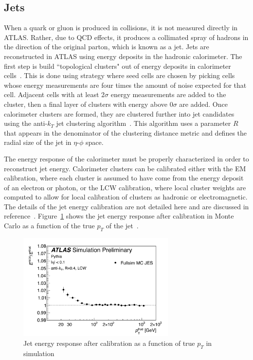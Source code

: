 \subsection{Jets}

When a quark or gluon is produced in collisions, it is not measured directly in ATLAS. Rather, due to QCD effects, it produces a collimated spray of hadrons in the direction of the original parton, which is known as a jet. Jets are reconstructed in ATLAS using energy deposits in the hadronic calorimeter. The first step is build ``topological clusters" out of energy deposits in calorimeter cells~\cite{TopoClusters,TopoClusters2}. This is done using strategy where seed cells are chosen by picking cells whose energy measurements are four times the amount of noise expected for that cell. Adjacent cells with at least $2\sigma$ energy measurements are added to the cluster, then a final layer of clusters with energy above $0\sigma$ are added. Once calorimeter clusters are formed, they are clustered further into jet candidates using the anti-$k_T$ jet clustering algorithm~\cite{AntiKt}. This algorithm uses a parameter $R$ that appears in the denominator of the clustering distance metric and defines the radial size of the jet in $\eta$-$\phi$ space. 

The energy response of the calorimeter must be properly characterized in order to reconstruct jet energy. Calorimeter clusters can be calibrated either with the EM calibration, where each cluster is assumed to have come from the energy deposit of an electron or photon, or the LCW calibration, where local cluster weights are computed to allow for local calibration of clusters as hadronic or electromagnetic. The details of the jet energy calibration are not detailed here and are discussed in reference~\cite{JetCalib}. Figure~\ref{fig:jets} shows the jet energy response after calibration in Monte Carlo as a function of the true $p_{T}$ of the jet~\cite{JetCalib}.

\begin{figure}[h!]
  \centering
  \captionsetup{justification=centering}

  \includegraphics[width=0.7\textwidth]{figures/JetReso}
   \caption{Jet energy response after calibration as a function of true $p_{T}$ in simulation~\cite{JetCalib}}
  \label{fig:jets}
\end{figure}

